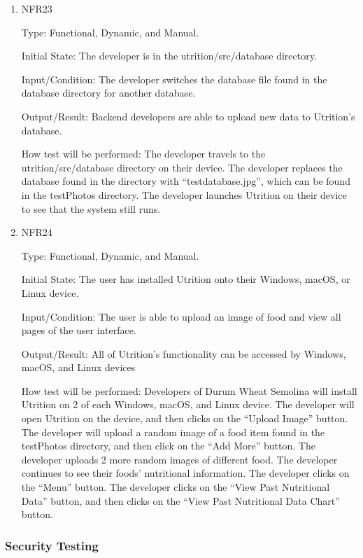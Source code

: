 \documentclass[12pt, titlepage]{article}
\begin{document}
	\begin{enumerate}
		
		\item{NFR23\\} 
		
		Type: Functional, Dynamic, and Manual.
		
		Initial State: The developer is in the utrition/src/database directory.
		
		Input/Condition: The developer switches the database file found in the database directory for another database.
		
		Output/Result: Backend developers are able to upload new data to Utrition’s database.
		
		How test will be performed: The developer travels to the utrition/src/database directory on their device. The developer replaces the database found in the directory with “testdatabase.jpg”, which can be found in the testPhotos directory. The developer launches Utrition on their device to see that the system still runs.	
		
		\item{NFR24\\} 
		
		Type: Functional, Dynamic, and Manual.
		
		Initial State: The user has installed Utrition onto their Windows, macOS, or Linux device.
		
		Input/Condition: The user is able to upload an image of food and view all pages of the user interface.
		
		Output/Result: All of Utrition’s functionality can be accessed by Windows, macOS, and Linux devices
		
		How test will be performed: Developers of Durum Wheat Semolina will install Utrition on 2 of each Windows, macOS, and Linux device. The developer will open Utrition on the device, and then clicks on the “Upload Image” button. The developer will upload a random image of a food item found in the testPhotos directory, and then click on the “Add More” button. The developer uploads 2 more random images of different food. The developer continues to see their foods’ nutritional information. The developer clicks on the “Menu” button. The developer clicks on the “View Past Nutritional Data” button, and then clicks on the “View Past Nutritional Data Chart” button.
		
	\end{enumerate}
	
	\subsubsection{Security Testing}
	
\end{document}
